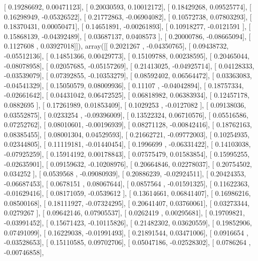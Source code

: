 \documentclass{article}
\begin{document}
       [ 0.19286692,  0.00471123],
       [ 0.20030593,  0.10012172],
       [ 0.18429268,  0.09525774],
       [ 0.16298949, -0.05326522],
       [ 0.21772863, -0.06904082],
       [ 0.10572738,  0.07803293],
       [ 0.18370431,  0.00050471],
       [ 0.14651891, -0.00261893],
       [ 0.10918277, -0.0121591 ],
       [ 0.15868139, -0.04392489],
       [ 0.03687137,  0.0408573 ],
       [ 0.20000786, -0.08665094],
       [ 0.1127608 ,  0.03927018]]), array([[ 0.2021267 , -0.04350765],
       [ 0.09438732, -0.05512136],
       [ 0.14851366,  0.00429773],
       [ 0.15109788,  0.00238595],
       [ 0.20465044, -0.08078958],
       [ 0.02057685, -0.05157269],
       [ 0.21413025, -0.04925714],
       [ 0.04128333, -0.03539079],
       [ 0.07392855, -0.10353279],
       [ 0.08592402,  0.06564472],
       [ 0.03363083, -0.04541329],
       [ 0.15050579,  0.08009936],
       [ 0.11107   , -0.04042894],
       [ 0.18757334, -0.02661642],
       [ 0.04431042,  0.06472525],
       [ 0.06818982,  0.06383934],
       [ 0.12457178,  0.0882695 ],
       [ 0.17261989,  0.01853409],
       [ 0.1029253 , -0.0127082 ],
       [ 0.09138036,  0.03552875],
       [ 0.0233254 , -0.09396009],
       [ 0.13522324,  0.06710576],
       [ 0.05516586,  0.07252762],
       [ 0.08010601, -0.00196939],
       [ 0.08271128, -0.00842416],
       [ 0.18762163,  0.08385455],
       [ 0.08001304,  0.04529593],
       [ 0.21662721, -0.09772003],
       [ 0.10254935,  0.02344805],
       [ 0.11119181, -0.01440454],
       [ 0.1996699 , -0.06331422],
       [ 0.14103038, -0.07925259],
       [ 0.15914192,  0.00178843],
       [ 0.07575479,  0.01583854],
       [ 0.15995255, -0.02635901],
       [ 0.09159632, -0.10208976],
       [ 0.20664846,  0.02278037],
       [ 0.20754502,  0.034252  ],
       [ 0.0539568 , -0.09080939],
       [ 0.20886239, -0.02924511],
       [ 0.20424353, -0.06687453],
       [ 0.0678151 ,  0.08067644],
       [ 0.0857564 , -0.01591325],
       [ 0.11622363, -0.01629416],
       [ 0.08171059, -0.0539612 ],
       [ 0.13614661,  0.06841407],
       [ 0.16986216,  0.08500168],
       [ 0.18111927, -0.07324295],
       [ 0.20641407,  0.03760061],
       [ 0.03273344,  0.0279267 ],
       [ 0.09642146,  0.07905537],
       [ 0.0262419 ,  0.00295681],
       [ 0.19709821, -0.03991452],
       [ 0.15671423, -0.10115826],
       [ 0.21482302,  0.03620559],
       [ 0.19852906,  0.07491099],
       [ 0.16229038, -0.01991493],
       [ 0.21891544,  0.03471006],
       [ 0.0916654 , -0.03528653],
       [ 0.15110585,  0.09702706],
       [ 0.05047186, -0.02528302],
       [ 0.0786264 , -0.00746858],
\end{document}

